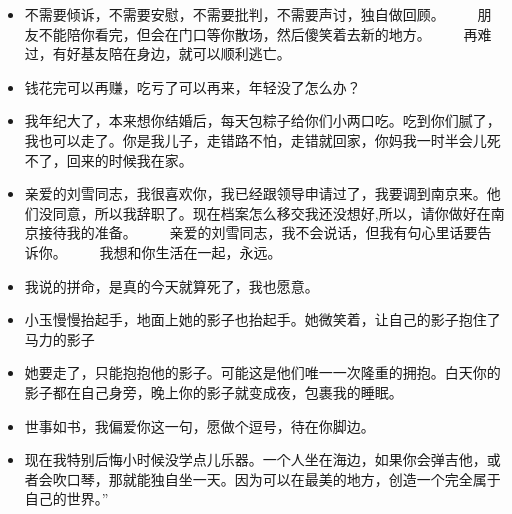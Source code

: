 \documentclass[UTF8,a4paper,8pt]{ctexart}
\begin{document}
\begin{itemize}
 	\item 不需要倾诉，不需要安慰，不需要批判，不需要声讨，独自做回顾。 　　朋友不能陪你看完，但会在门口等你散场，然后傻笑着去新的地方。 　　再难过，有好基友陪在身边，就可以顺利逃亡。
 	\item 钱花完可以再赚，吃亏了可以再来，年轻没了怎么办？
 	\item 我年纪大了，本来想你结婚后，每天包粽子给你们小两口吃。吃到你们腻了，我也可以走了。你是我儿子，走错路不怕，走错就回家，你妈我一时半会儿死不了，回来的时候我在家。
 	\item 亲爱的刘雪同志，我很喜欢你，我已经跟领导申请过了，我要调到南京来。他们没同意，所以我辞职了。现在档案怎么移交我还没想好,所以，请你做好在南京接待我的准备。 　　亲爱的刘雪同志，我不会说话，但我有句心里话要告诉你。 　　我想和你生活在一起，永远。
 	\item 我说的拼命，是真的今天就算死了，我也愿意。
 	\item 小玉慢慢抬起手，地面上她的影子也抬起手。她微笑着，让自己的影子抱住了马力的影子
 	\item 她要走了，只能抱抱他的影子。可能这是他们唯一一次隆重的拥抱。白天你的影子都在自己身旁，晚上你的影子就变成夜，包裹我的睡眠。
 	\item 世事如书，我偏爱你这一句，愿做个逗号，待在你脚边。
 	\item 现在我特别后悔小时候没学点儿乐器。一个人坐在海边，如果你会弹吉他，或者会吹口琴，那就能独自坐一天。因为可以在最美的地方，创造一个完全属于自己的世界。” 　　
 	

\end{itemize}
\end{document}
